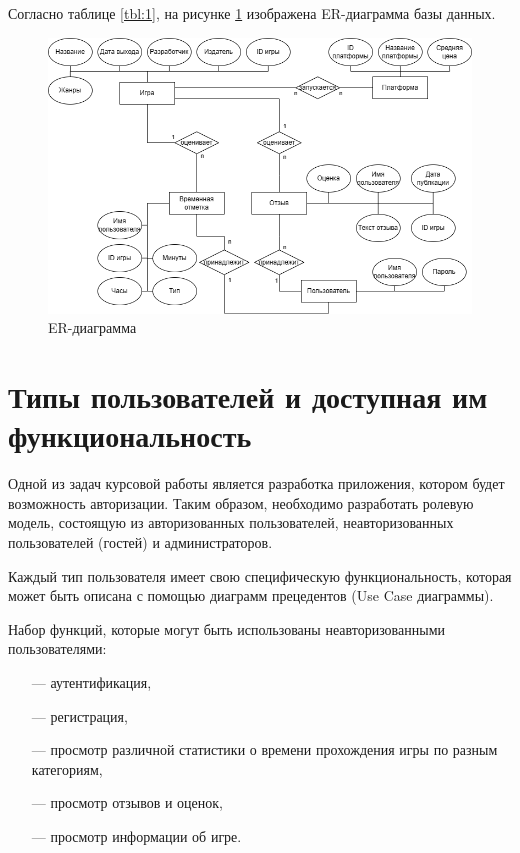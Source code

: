 Согласно таблице \ref{tbl:1}, на рисунке \ref{img:er} изображена ER-диаграмма базы данных.

\begin{figure}[H]
	\begin{center}
		\includegraphics[scale=0.6]{../imgs/er.png}
	\end{center}
	\captionsetup{justification=centering}
	\caption{ER-диаграмма}
	\label{img:er}
\end{figure}

\section{Типы пользователей и доступная им функциональность}\label{functions}

Одной из задач курсовой работы является разработка приложения, котором будет возможность авторизации. Таким образом, необходимо разработать ролевую модель, состоящую из авторизованных пользователей, неавторизованных пользователей (гостей) и администраторов.

Каждый тип пользователя имеет свою специфическую функциональность, которая может быть описана с помощью диаграмм прецедентов (Use Case диаграммы). 

Набор функций, которые могут быть использованы неавторизованными пользователями:
\begin{itemize}
	\item[---] аутентификация,
	\item[---] регистрация,
	\item[---] просмотр различной статистики о времени прохождения игры по разным категориям,
	\item[---] просмотр отзывов и оценок,	
	\item[---] просмотр информации об игре. 
\end{itemize}

